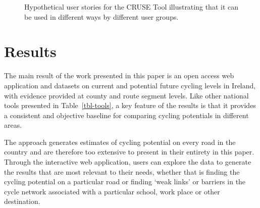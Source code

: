 \documentclass[
  super,
  preprint,
  3p]{elsarticle}
\begin{document}
\begin{figure}


\caption{\label{fig-user-stories}Hypothetical user stories for the CRUSE
Tool illustrating that it can be used in different ways by different
user groups.}

\end{figure}%

\section{Results}\label{sec-results}

The main result of the work presented in this paper is an open access
web application and datasets on current and potential future cycling
levels in Ireland, with evidence provided at county and route segment
levels. Like other national tools presented in Table~\ref{tbl-tools}, a
key feature of the results is that it provides a consistent and
objective baseline for comparing cycling potentials in different areas.

The approach generates estimates of cycling potential on every road in
the country and are therefore too extensive to present in their entirety
in this paper. Through the interactive web application, users can
explore the data to generate the results that are most relevant to their
needs, whether that is finding the cycling potential on a particular
road or finding `weak links' or barriers in the cycle network associated
with a particular school, work place or other destination.
\end{document}

